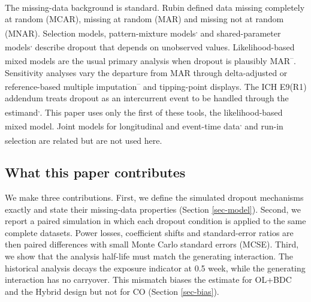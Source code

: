 \documentclass[
  11pt,
]{article}
\begin{document}
The missing-data background is standard. Rubin\textsuperscript{} defined data
missing completely at random (MCAR), missing at random (MAR) and
missing not at random (MNAR)\textsuperscript{}. Selection models\textsuperscript{}, pattern-mixture models\textsuperscript{,} and shared-parameter models\textsuperscript{,} describe dropout that
depends on unobserved values. Likelihood-based mixed models are the
usual primary analysis when dropout is plausibly MAR\textsuperscript{--}. Sensitivity
analyses vary the departure from MAR through delta-adjusted or
reference-based multiple imputation\textsuperscript{--} and tipping-point displays\textsuperscript{}. The ICH E9(R1) addendum treats dropout as
an intercurrent event to be handled through the estimand\textsuperscript{,}. This paper uses only the
first of these tools, the likelihood-based mixed model. Joint models
for longitudinal and event-time data\textsuperscript{,} and run-in selection\textsuperscript{} are related
but are not used here.

\subsection{What this paper contributes}\label{what-this-paper-contributes}

We make three contributions. First, we define the simulated dropout
mechanisms exactly and state their missing-data properties
(Section \ref{sec-model}). Second, we report a paired simulation in
which each dropout condition is applied to the same complete datasets.
Power losses, coefficient shifts and standard-error ratios are then
paired differences with small Monte Carlo standard errors (MCSE).
Third, we show that the analysis half-life must match the generating
interaction. The historical analysis decays the exposure indicator at
0.5 week, while the generating interaction has no carryover. This
mismatch biases the estimate for OL+BDC and the Hybrid design but not
for CO (Section \ref{sec-bias}).
\end{document}
